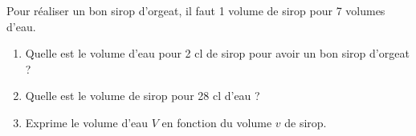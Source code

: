
Pour réaliser un bon sirop d'orgeat, il faut 1 volume de sirop pour 7 volumes d'eau.
\begin{enumerate}
\item Quelle est le volume d'eau pour 2 cl de sirop pour avoir un bon sirop d'orgeat ?
\item Quelle est le volume de sirop pour 28 cl d'eau ?
\item Exprime le volume d'eau $V$ en fonction du volume $v$ de sirop.
\end{enumerate}